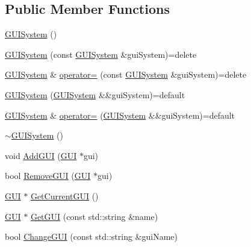\subsection*{Public Member Functions}
\begin{DoxyCompactItemize}
\item 
\mbox{\hyperlink{classngl__gui_1_1_g_u_i_system_ae3b077b89c26ad3b6fdc3f6552d7508e}{G\+U\+I\+System}} ()
\item 
\mbox{\hyperlink{classngl__gui_1_1_g_u_i_system_afc422ee53a06e72b1faf11df5f723792}{G\+U\+I\+System}} (const \mbox{\hyperlink{classngl__gui_1_1_g_u_i_system}{G\+U\+I\+System}} \&gui\+System)=delete
\item 
\mbox{\hyperlink{classngl__gui_1_1_g_u_i_system}{G\+U\+I\+System}} \& \mbox{\hyperlink{classngl__gui_1_1_g_u_i_system_a72358aba320d94377b8c2dfbdb7a78bc}{operator=}} (const \mbox{\hyperlink{classngl__gui_1_1_g_u_i_system}{G\+U\+I\+System}} \&gui\+System)=delete
\item 
\mbox{\hyperlink{classngl__gui_1_1_g_u_i_system_add8945f8c4a203128ff35878d3e9447b}{G\+U\+I\+System}} (\mbox{\hyperlink{classngl__gui_1_1_g_u_i_system}{G\+U\+I\+System}} \&\&gui\+System)=default
\item 
\mbox{\hyperlink{classngl__gui_1_1_g_u_i_system}{G\+U\+I\+System}} \& \mbox{\hyperlink{classngl__gui_1_1_g_u_i_system_a7d917255efcdbf070857f4c9846646d2}{operator=}} (\mbox{\hyperlink{classngl__gui_1_1_g_u_i_system}{G\+U\+I\+System}} \&\&gui\+System)=default
\item 
\mbox{\hyperlink{classngl__gui_1_1_g_u_i_system_aea572afaf1840acb0da5da07a1eb551b}{$\sim$\+G\+U\+I\+System}} ()
\item 
void \mbox{\hyperlink{classngl__gui_1_1_g_u_i_system_a4743d6da816cae8e319fe9351854731f}{Add\+G\+UI}} (\mbox{\hyperlink{classngl__gui_1_1_g_u_i}{G\+UI}} $\ast$gui)
\item 
bool \mbox{\hyperlink{classngl__gui_1_1_g_u_i_system_a5d826ebd83f05e1332cd9737fc43ecd3}{Remove\+G\+UI}} (\mbox{\hyperlink{classngl__gui_1_1_g_u_i}{G\+UI}} $\ast$gui)
\item 
\mbox{\hyperlink{classngl__gui_1_1_g_u_i}{G\+UI}} $\ast$ \mbox{\hyperlink{classngl__gui_1_1_g_u_i_system_a81746712ea980afa64f95b630ee498d7}{Get\+Current\+G\+UI}} ()
\item 
\mbox{\hyperlink{classngl__gui_1_1_g_u_i}{G\+UI}} $\ast$ \mbox{\hyperlink{classngl__gui_1_1_g_u_i_system_adeb4564e37eb08d12419ee91cc6b2f89}{Get\+G\+UI}} (const std\+::string \&name)
\item 
bool \mbox{\hyperlink{classngl__gui_1_1_g_u_i_system_a437c1de904bcfd2427d062ad147dbacc}{Change\+G\+UI}} (const std\+::string \&gui\+Name)
\end{DoxyCompactItemize}


